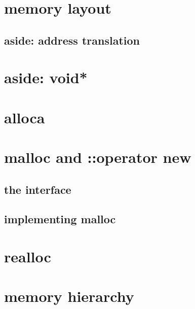 
\begin{frame}
    \titlepage
\end{frame}

\section{memory layout}




\subsection{aside: address translation}


\section{aside: void*}



\section{alloca}



\section{malloc and ::operator new}

\subsection{the interface}



\subsection{implementing malloc}



\section{realloc}



\section{memory hierarchy}

